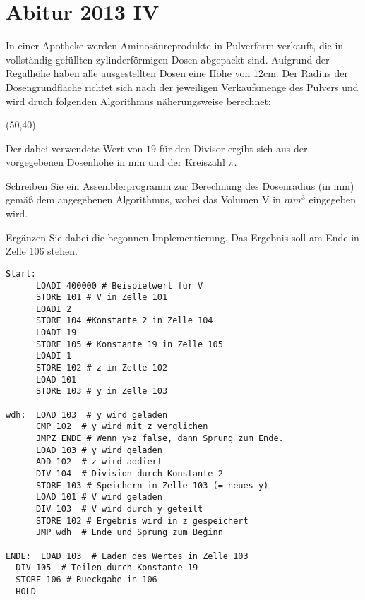 \documentclass{lehramt-informatik-aufgabe}
\begin{document}

\section{Abitur 2013 IV}

In einer Apotheke werden Aminosäureprodukte in Pulverform verkauft, die
in vollständig gefüllten zylinderförmigen Dosen abgepackt sind. Aufgrund
der Regalhöhe haben alle ausgestellten Dosen eine Höhe von 12cm. Der
Radius der Dosengrundfläche richtet sich nach der jeweiligen
Verkaufsmenge des Pulvers und wird druch folgenden Algorithmus
näherungsweise berechnet:

\begin{struktogramm}(50,40)
 \whileend
{}
\end{struktogramm}

Der dabei verwendete Wert von $19$ für den Divisor ergibt sich aus der
vorgegebenen Dosenhöhe in mm und der Kreiszahl $\pi$.

Schreiben Sie ein Assemblerprogramm zur Berechnung des Dosenradius (in
mm) gemäß dem angegebenen Algorithmus, wobei das Volumen V in $mm^3$
eingegeben wird.

Ergänzen Sie dabei die begonnen Implementierung. Das Ergebnis soll am
Ende in Zelle 106 stehen.

\begin{verbatim}
Start:
      LOADI 400000 # Beispielwert für V
      STORE 101 # V in Zelle 101
      LOADI 2
      STORE 104 #Konstante 2 in Zelle 104
      LOADI 19
      STORE 105 # Konstante 19 in Zelle 105
      LOADI 1
      STORE 102 # z in Zelle 102
      LOAD 101
      STORE 103 # y in Zelle 103

wdh:  LOAD 103  # y wird geladen
      CMP 102  # y wird mit z verglichen
      JMPZ ENDE # Wenn y>z false, dann Sprung zum Ende.
      LOAD 103 # y wird geladen
      ADD 102  # z wird addiert
      DIV 104  # Division durch Konstante 2
      STORE 103 # Speichern in Zelle 103 (= neues y)
      LOAD 101 # V wird geladen
      DIV 103  # V wird durch y geteilt
      STORE 102 # Ergebnis wird in z gespeichert
      JMP wdh  # Ende und Sprung zum Beginn

ENDE:  LOAD 103  # Laden des Wertes in Zelle 103
  DIV 105  # Teilen durch Konstante 19
  STORE 106 # Rueckgabe in 106
  HOLD
\end{verbatim}
\end{document}
